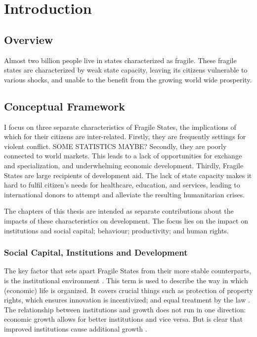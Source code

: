\chapter{Introduction}
\section{Overview}



Almost two billion people live in states characterized as fragile. These fragile states are characterized by weak state capacity, leaving its citizens vulnerable to various shocks, and unable to the benefit from the growing world wide prosperity. %




\section{Conceptual Framework}
I focus on three separate characteristics of Fragile States, the implications of which for their citizens are inter-related. Firstly, they are frequently settings for violent conflict. SOME STATISTICS MAYBE? Secondly, they are poorly connected to world markets. This leads to a lack of opportunities for exchange and specialization, and underwhelming economic development. Thirdly, Fragile States are large recipients of development aid. The lack of state capacity makes it hard to fulfil citizen's needs for healthcare, education, and services, leading to international donors to attempt and alleviate the resulting humanitarian crises.

The chapters of this thesis are intended as separate contributions about the impacts of these characteristics on development. The focus lies on the impact on institutions and social capital; behaviour; productivity; and human rights. 




\subsection{Social Capital, Institutions and Development}
The key factor that sets apart Fragile States from their more stable counterparts, is the institutional environment \cite{Rodrik2004,Acemoglu2000}. This term is used to describe the way in which (economic) life is organized. It covers crucial things such as protection of property rights, which ensures innovation is incentivized; and equal treatment by the law \citep{Acemoglu2005}. The relationship between institutions and growth does not run in one direction: economic growth allows for better institutions and vice versa. But is clear that improved institutions cause additional growth \cite{Acemoglu2000}.

